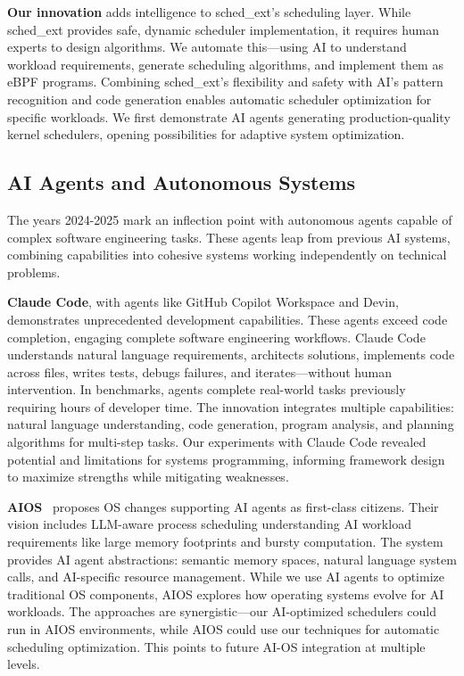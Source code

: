 \textbf{Our innovation} adds intelligence to sched\_ext's scheduling layer. While sched\_ext provides safe, dynamic scheduler implementation, it requires human experts to design algorithms. We automate this—using AI to understand workload requirements, generate scheduling algorithms, and implement them as eBPF programs. Combining sched\_ext's flexibility and safety with AI's pattern recognition and code generation enables automatic scheduler optimization for specific workloads. We first demonstrate AI agents generating production-quality kernel schedulers, opening possibilities for adaptive system optimization.

\subsection{AI Agents and Autonomous Systems}

The years 2024-2025 mark an inflection point with autonomous agents capable of complex software engineering tasks. These agents leap from previous AI systems, combining capabilities into cohesive systems working independently on technical problems.

\textbf{Claude Code}, with agents like GitHub Copilot Workspace and Devin, demonstrates unprecedented development capabilities. These agents exceed code completion, engaging complete software engineering workflows. Claude Code understands natural language requirements, architects solutions, implements code across files, writes tests, debugs failures, and iterates—without human intervention. In benchmarks, agents complete real-world tasks previously requiring hours of developer time. The innovation integrates multiple capabilities: natural language understanding, code generation, program analysis, and planning algorithms for multi-step tasks. Our experiments with Claude Code revealed potential and limitations for systems programming, informing framework design to maximize strengths while mitigating weaknesses.

\textbf{AIOS}~\cite{mei2024aios} proposes OS changes supporting AI agents as first-class citizens. Their vision includes LLM-aware process scheduling understanding AI workload requirements like large memory footprints and bursty computation. The system provides AI agent abstractions: semantic memory spaces, natural language system calls, and AI-specific resource management. While we use AI agents to optimize traditional OS components, AIOS explores how operating systems evolve for AI workloads. The approaches are synergistic—our AI-optimized schedulers could run in AIOS environments, while AIOS could use our techniques for automatic scheduling optimization. This points to future AI-OS integration at multiple levels.

